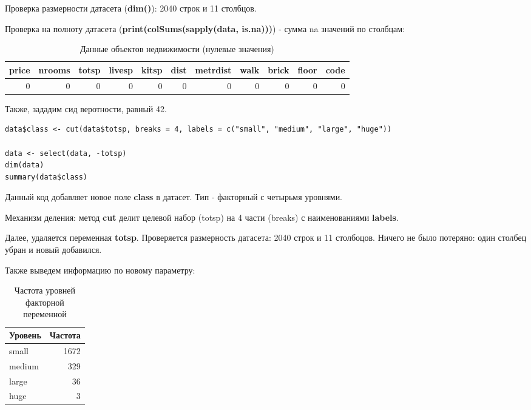 Проверка размерности датасета (\textbf{dim()}): 2040 строк и 11 столбцов.
\newline

Проверка на полноту датасета (\textbf{print(colSums(sapply(data, is.na)))}) - сумма na значений по столбцам:
\begin{table}[h]
	\centering
	\caption{Данные объектов недвижимости (нулевые значения)}
	\begin{tabular}{@{}rrrrrrrrrrr@{}}
		\toprule
		price & nrooms & totsp & livesp & kitsp & dist & metrdist & walk & brick & floor & code \\ \midrule
		0     & 0      & 0     & 0      & 0     & 0    & 0        & 0    & 0     & 0     & 0    \\ \bottomrule
	\end{tabular}
\end{table}

Также, зададим сид веротности, равный 42.


\begin{lstlisting}[label=R, caption={Формирование классов на основании переменной totsp}]
data$class <- cut(data$totsp, breaks = 4, labels = c("small", "medium", "large", "huge"))

data <- select(data, -totsp)
dim(data)
summary(data$class)
\end{lstlisting}

Данный код добавляет новое поле \textbf{class} в датасет. 
Тип - факторный с четырьмя уровнями.

Механизм деления: метод \textbf{cut} делит целевой набор (totsp) на 4 части (breaks) с наименованиями \textbf{labels}.

Далее, удаляется переменная \textbf{totsp}.
Проверяется размерность датасета: 2040 строк и 11 столбоцов. Ничего не было потеряно: один столбец убран и новый добавился.

Также выведем информацию по новому параметру:	
\begin{table}[h]
	\centering
	\caption{Частота уровней факторной переменной}
	\begin{tabular}{@{}lr@{}}
		\toprule
		Уровень & Частота \\ \midrule
		small   & 1672    \\
		medium  & 329     \\
		large   & 36      \\
		huge    & 3       \\ \bottomrule
	\end{tabular}
\end{table}
\newline\\

